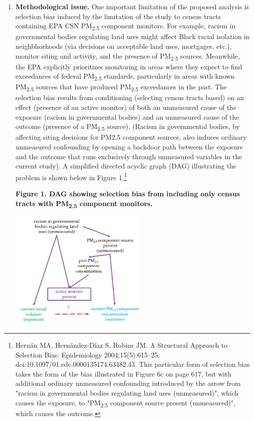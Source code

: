 \documentclass{article}\usepackage[]{graphicx}\usepackage[]{color}
\begin{document}
\begin{enumerate}[label=\textbf{\arabic*.}]
\begin{enumerate}[label=\textbf{\alph*.}]
    \end{enumerate}
  
  \item \textbf{Methodological issue.} One important limitation of the proposed analysis is selection bias induced by the limitation of the study to census tracts containing EPA CSN PM\textsubscript{2.5} component monitors. For example, racism in governmental bodies regulating land uses might affect Black racial isolation in neighbhorhoods (via decisions on acceptable land uses, mortgages, etc.), monitor siting and activity, and the presence of PM\textsubscript{2.5} sources. Meanwhile, the EPA explicitly prioritizes monitoring in areas where they expect to find exceedances of federal PM\textsubscript{2.5} standards, particularly in areas with known PM\textsubscript{2.5} sources that have produced PM\textsubscript{2.5} exceedances in the past. The selection bias results from conditioning (selecting census tracts based) on an effect (presence of an active monitor) of both an unmeasured cause of the exposure (racism in governmental bodies) and an unmeasured cause of the outcome (presence of a PM\textsubscript{2.5} source). (Racism in governmental bodies, by affecting siting decisions for PM2.5 component sources, also induces ordinary unmeasured confounding by opening a backdoor path between the exposure and the outcome that runs exclusively through unmeasured variables in the current study). A simplified directed acyclic graph (DAG) illustrating the problem is shown below in Figure 1.\footnote{Hernán MA, Hernández-Díaz S, Robins JM. A Structural Approach to Selection Bias: Epidemiology 2004;15(5):615–25. doi:10.1097/01.ede.0000135174.63482.43. This particular form of selection bias takes the form of the bias illustrated in Figure 6c on page 617, but with additional ordinary unmeasured confounding introduced by the arrow from "racism in governmental bodies regulating land uses (unmeasured)", which causes the exposure, to "PM\textsubscript{2.5} component source present (unmeasured)", which causes the outcome.}
  
  \textbf{Figure 1. DAG showing selection bias from including only census tracts with PM\textsubscript{2.5} component monitors.}
  
  \includegraphics[height=2.3in]{midtermdag.JPG}


\end{enumerate}
\end{document}

